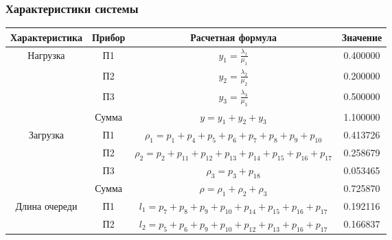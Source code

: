 \subsubsection{Характеристики системы}
\begin{adjustbox}{max width=\textwidth}
\begin{tabular}{|c|c|c|c|}
\hline
Характеристика                      & Прибор & Расчетная формула                                                                                             & Значение  \\ \hline
\multirow{4}{*}{Нагрузка}           & П1     & $y_1 = \frac{\lambda_1}{\mu_1}$                                                                               & 0.400000  \\ \cline{2-4}
                                    & П2     & $y_2 = \frac{\lambda_2}{\mu_2}$                                                                               & 0.200000  \\ \cline{2-4}
                                    & П3     & $y_3 = \frac{\lambda_3}{\mu_3}$                                                                               & 0.500000  \\ \cline{2-4}
                                    & Сумма  & $y = y_1+y_2+y_3$                                                                                             & 1.100000  \\ \hline
\multirow{4}{*}{Загрузка}           & П1     & $\rho_1 = p_1+p_4+p_5+p_6+p_7+p_8+p_9+p_{10}$                                                                 & 0.413726  \\ \cline{2-4}
                                    & П2     & $\rho_2 = p_2+p_{11}+p_{12}+p_{13}+p_{14}+p_{15}+p_{16}+p_{17}$                                               & 0.258679  \\ \cline{2-4}
                                    & П3     & $\rho_3 = p_3+p_{18}$                                                                                         & 0.053465  \\ \cline{2-4}
                                    & Сумма  & $\rho = \rho_1+\rho_2+\rho_3$                                                                                 & 0.725870  \\ \hline
\multirow{4}{*}{Длина очереди}      & П1     & $l_1 = p_7+p_8+p_9+p_{10}+p_{14}+p_{15}+p_{16}+p_{17}$                                                        & 0.192116  \\ \cline{2-4}
                                    & П2     & $l_2 = p_5+p_6+p_9+p_{10}+p_{12}+p_{13}+p_{16}+p_{17}$                                                        & 0.166837  \\ \cline{2-4}

\end{tabular}
\end{adjustbox}

